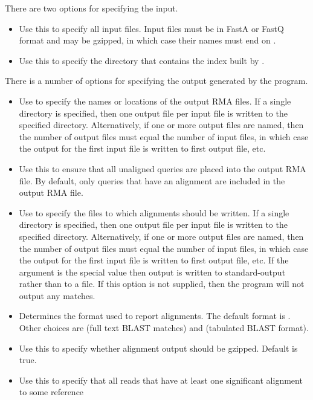 \documentclass[11pt]{article}
\begin{document}
There are two options for specifying the input.
\begin{itemize}
\setlength{\itemindent}{30pt}
\item [\itt{--inFile}] Use this to specify all input files. Input files must be in FastA or FastQ format and
may be gzipped, in which case their names must end on . 
\item[\itt{--index}] Use this to specify the directory that contains the index built by .
\end{itemize}

There is a number of options for specifying the output generated by the program.
\begin{itemize}
\setlength{\itemindent}{30pt}
\item[\itt{--output}]   Use to specify the names or locations of the output RMA files.
	If a single directory is specified, then one output file
per input file is written to the specified directory. Alternatively, if one or more output files are named, then
the number of output files must equal the number of input files, in which case the output for the first
input file is written to first output file, etc. 
\item[\itt{--includeUnaligned}] Use this to ensure that all unaligned queries are placed into the output RMA file. By default, only
queries that have an alignment are included in the output RMA file.
\item[\itt{--alignments}]   Use to specify the files to which alignments should be written.
	If a single directory is specified, then one output file
per input file is written to the specified directory. Alternatively, if one or more output files are named, then
the number of output files must equal the number of input files, in which case the output for the first
input file is written to first output file, etc. If the argument is the special value  then output is written
to standard-output rather than to a file. If this option is not supplied, then the program will not output any matches.
\item[\itt{--format}]  Determines the format used to report alignments. The default format is .
	Other choices are  (full text BLAST matches) and  (tabulated BLAST format).
\item[\itt{--gzipOutput}]   Use this to specify whether alignment output should be gzipped. Default is true.
\item[\itt{--outAligned}]        Use this to specify that all reads that have at least one significant alignment to some reference

\end{itemize}
\end{document}

